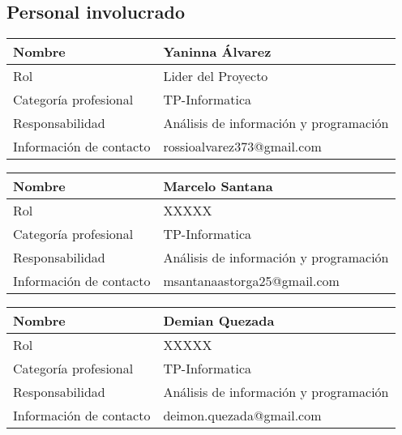 \documentclass {article}
\begin{document}
\subsection{Personal involucrado}
\begin{center}
    \begin{tabularx}{\textwidth}{|>{\hsize=0.5\hsize}X|>{\hsize=1.5\hsize}X|}
    \hline
     Nombre & Yaninna Álvarez \\
     \hline
     Rol & Lider del Proyecto \\
     \hline
     Categoría profesional & TP-Informatica  \\
     \hline
     Responsabilidad & Análisis de información y programación  \\
     \hline
     Información de contacto & rossioalvarez373@gmail.com \\
     \hline
    \end{tabularx}
    
    \vspace{1cm}
    
    \begin{tabularx}{\textwidth}{|>{\hsize=0.5\hsize}X|>{\hsize=1.5\hsize}X|}
    \hline
     Nombre & Marcelo Santana \\
     \hline
     Rol & XXXXX \\
     \hline
     Categoría profesional & TP-Informatica  \\
     \hline
     Responsabilidad & Análisis de información y programación  \\
     \hline
     Información de contacto & msantanaastorga25@gmail.com \\
     \hline
    \end{tabularx}
    
    \vspace{1cm}
    
    \begin{tabularx}{\textwidth}{|>{\hsize=0.5\hsize}X|>{\hsize=1.5\hsize}X|}
    \hline
     Nombre & Demian Quezada \\
     \hline
     Rol & XXXXX \\
     \hline
     Categoría profesional & TP-Informatica  \\
     \hline
     Responsabilidad & Análisis de información y programación  \\
     \hline
     Información de contacto & deimon.quezada@gmail.com \\
     \hline
    \end{tabularx}
    

\end{center}
\end{document}
